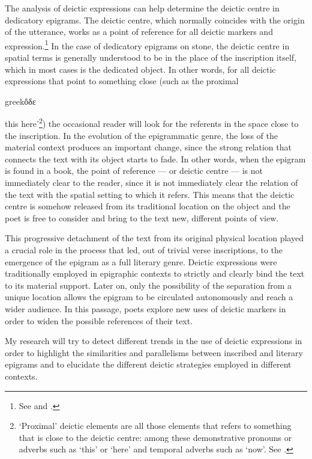 \documentclass[amsthm,ebook]{saparticle}
\begin{document}
The analysis of deictic expressions can help determine the deictic centre in dedicatory epigrams. The deictic
centre, which normally coincides with the origin of the utterance, works as a point of reference for all deictic
markers and expression.\footnote{See \citet[102f.]{buhler_sprachtheorie:_1982} and \citet[63f.]{levinson_pragmatics_1983}.} In the case of dedicatory
epigrams on stone, the deictic centre in spatial terms is generally understood to be in the place of the inscription
itself, which in most cases is the dedicated object. In other words, for all deictic expressions that point to
something close (such as the proximal \begin{otherlanguage*}{greek}ὅδε\end{otherlanguage*} this here'\footnote{ `Proximal' deictic elements are all those
elements that refers to something that is close to the deictic centre: among these demonstrative pronouns or adverbs such as `this' or `here' and
temporal adverbs such as `now'. See \citet[2408f.]{diessel_deixis_2012}.}) the occasional reader will look for the referents in the
space close to the inscription. In the evolution of the epigrammatic genre, the loss of the material context produces
an important change, since the strong relation that connects the text with its object starts to fade. In other words, when the epigram is found in a book, the point of reference --- or deictic centre --- is not immediately clear to the reader, since it is not immediately clear the relation of the text with the spatial setting to which it refers.  This means that
the deictic centre is somehow released from its traditional location on the object and the poet is free to consider and
bring to the text new, different points of view. 

This progressive detachment of the text from its original physical location played a crucial role in the process
that led, out of trivial verse inscriptions, to the emergence of the epigram as a full literary genre. Deictic
expressions were traditionally employed in epigraphic contexts to strictly and clearly bind the text to its material
support. Later on, only the possibility of the separation from a unique location allows the epigram to be circulated
autonomously and reach a wider audience. In this passage, poets explore new uses of deictic markers in order to
widen the possible references of their text. 

\vspace{5pt}
My research will try to detect different trends in the use of deictic expressions in order to highlight the similarities
and parallelisms between inscribed and literary epigrams and to elucidate the different deictic strategies employed in
different contexts.
\end{document}
